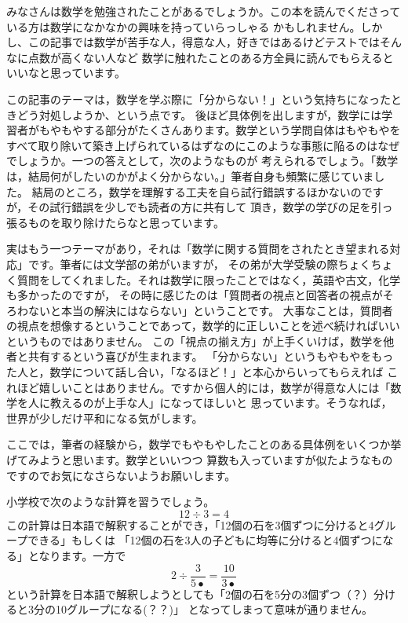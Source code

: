 \documentclass[./main]{subfiles}
\begin{document}
\newtheorem{thm}{命題}



みなさんは数学を勉強されたことがあるでしょうか。この本を読んでくださっている方は数学になかなかの興味を持っていらっしゃる
かもしれません。しかし、この記事では数学が苦手な人，得意な人，好きではあるけどテストではそんなに点数が高くない人など
数学に触れたことのある方全員に読んでもらえるといいなと思っています。

この記事のテーマは，数学を学ぶ際に「分からない！」という気持ちになったときどう対処しようか、という点です。
後ほど具体例を出しますが，数学には学習者がもやもやする部分がたくさんあります。数学という学問自体はもやもやを
すべて取り除いて築き上げられているはずなのにこのような事態に陥るのはなぜでしょうか。一つの答えとして，次のようなものが
考えられるでしょう。「数学は，結局何がしたいのかがよく分からない。」筆者自身も頻繁に感じていました。
結局のところ，数学を理解する工夫を自ら試行錯誤するほかないのですが，その試行錯誤を少しでも読者の方に共有して
頂き，数学の学びの足を引っ張るものを取り除けたらなと思っています。

実はもう一つテーマがあり，それは「数学に関する質問をされたとき望まれる対応」です。筆者には文学部の弟がいますが，
その弟が大学受験の際ちょくちょく質問をしてくれました。それは数学に限ったことではなく，英語や古文，化学も多かったのですが，
その時に感じたのは「質問者の視点と回答者の視点がそろわないと本当の解決にはならない」ということです。
大事なことは，質問者の視点を想像するということであって，数学的に正しいことを述べ続ければいいというものではありません。
この「視点の揃え方」が上手くいけば，数学を他者と共有するという喜びが生まれます。
「分からない」というもやもやをもった人と，数学について話し合い，「なるほど！」と本心からいってもらえれば
これほど嬉しいことはありません。ですから個人的には，数学が得意な人には「数学を人に教えるのが上手な人」になってほしいと
思っています。そうなれば，世界が少しだけ平和になる気がします。


ここでは，筆者の経験から，数学でもやもやしたことのある具体例をいくつか挙げてみようと思います。数学といいつつ
算数も入っていますが似たようなものですのでお気になさらないようお願いします。


小学校で次のような計算を習うでしょう。
\[
12 \div 3 = 4
\]
この計算は日本語で解釈することができ，「12個の石を3個ずつに分けると4グループできる」もしくは
「12個の石を3人の子どもに均等に分けると4個ずつになる」となります。一方で
\[
2 \div \frac{3}{5•} = \frac{10}{3•}
\]
という計算を日本語で解釈しようとしても「2個の石を5分の3個ずつ（？）分けると3分の10グループになる(？？)」
となってしまって意味が通りません。
\end{document}
